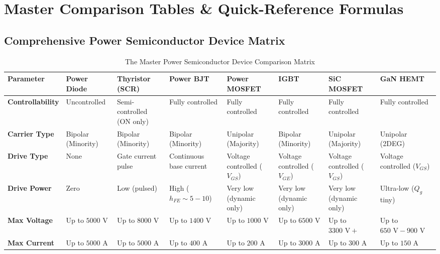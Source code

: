 \documentclass[11pt,a4paper]{article}
\begin{document}
\section{Master Comparison Tables \& Quick-Reference Formulas}

\subsection{Comprehensive Power Semiconductor Device Matrix}

\begin{table}[htbp]
\centering
\scriptsize
\setlength{\tabcolsep}{2.5pt}
\caption{The Master Power Semiconductor Device Comparison Matrix}
\label{tab:master_device_matrix}
\begin{tabularx}{\textwidth}{l p{1.6cm} p{1.6cm} p{1.6cm} p{1.8cm} p{1.8cm} p{1.8cm} X}
\toprule
\textbf{Parameter} & \textbf{Power Diode} & \textbf{Thyristor (SCR)} & \textbf{Power BJT} & \textbf{Power MOSFET} & \textbf{IGBT} & \textbf{SiC MOSFET} & \textbf{GaN HEMT} \\
\midrule
\textbf{Controllability} & Uncontrolled & Semi-controlled (ON only) & Fully controlled & Fully controlled & Fully controlled & Fully controlled & Fully controlled \\
\textbf{Carrier Type} & Bipolar (Minority) & Bipolar (Minority) & Bipolar (Minority) & Unipolar (Majority) & Bipolar (Minority) & Unipolar (Majority) & Unipolar (2DEG) \\
\textbf{Drive Type} & None & Gate current pulse & Continuous base current & Voltage controlled ($V_{GS}$) & Voltage controlled ($V_{GE}$) & Voltage controlled ($V_{GS}$) & Voltage controlled ($V_{GS}$) \\
\textbf{Drive Power} & Zero & Low (pulsed) & High ($h_{FE} \sim 5-10$) & Very low (dynamic only) & Very low (dynamic only) & Very low (dynamic only) & Ultra-low ($Q_g$ tiny) \\
\textbf{Max Voltage} & Up to $5000\text{ V}$ & Up to $8000\text{ V}$ & Up to $1400\text{ V}$ & Up to $1000\text{ V}$ & Up to $6500\text{ V}$ & Up to $3300\text{ V}+$ & Up to $650\text{ V} - 900\text{ V}$ \\
\textbf{Max Current} & Up to $5000\text{ A}$ & Up to $5000\text{ A}$ & Up to $400\text{ A}$ & Up to $200\text{ A}$ & Up to $3000\text{ A}$ & Up to $300\text{ A}$ & Up to $150\text{ A}$ \\

\end{tabularx}
\end{table}
\end{document}
